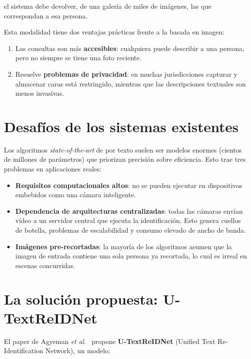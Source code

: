 \noindent el sistema debe devolver, de una galería de miles de
imágenes, las que correspondan a esa persona.

Esta modalidad tiene dos ventajas prácticas frente a la \reid{}
basada en imagen:

\begin{enumerate}
  \item Las consultas son más \textbf{accesibles}: cualquiera puede
        describir a una persona, pero no siempre se tiene una foto
        reciente.
  \item Resuelve \textbf{problemas de privacidad}: en muchas
        jurisdicciones capturar y almacenar caras está restringido,
        mientras que las descripciones textuales son menos invasivas.
\end{enumerate}

\section{Desafíos de los sistemas existentes}

Los algoritmos \emph{state-of-the-art} de \reid{} por texto suelen
ser modelos enormes (cientos de millones de parámetros) que
priorizan precisión sobre eficiencia. Esto trae tres problemas en
aplicaciones reales:

\begin{itemize}
  \item \textbf{Requisitos computacionales altos}: no se pueden
        ejecutar en dispositivos embebidos como una cámara
        inteligente.
  \item \textbf{Dependencia de arquitecturas centralizadas}: todas
        las cámaras envían vídeo a un servidor central que ejecuta
        la identificación. Esto genera cuellos de botella,
        problemas de escalabilidad y consumo elevado de ancho de
        banda.
  \item \textbf{Imágenes pre-recortadas}: la mayoría de los
        algoritmos asumen que la imagen de entrada contiene una
        sola persona ya recortada, lo cual es irreal en escenas
        concurridas.
\end{itemize}

\section{La solución propuesta: U-TextReIDNet}

El paper de Agyeman \emph{et al.}~\cite{agyeman2024decentralized}
propone \textbf{U-TextReIDNet} (Unified Text Re-Identification
Network), un modelo:

